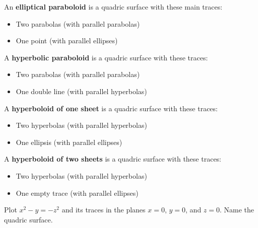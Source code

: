 \documentclass[letterpaper, twoside, 12pt]{book}
\begin{document}
\begin{definition}
  An \textbf{elliptical paraboloid} is a quadric surface with these main traces:
    \begin{itemize}
    \item Two parabolas (with parallel parabolas)
    \item One point (with parallel ellipses)
    \end{itemize}
\end{definition}

\begin{definition}
  A \textbf{hyperbolic paraboloid} is a quadric surface with these traces:
    \begin{itemize}
    \item Two parabolas (with parallel parabolas)
    \item One double line (with parallel hyperbolas)
    \end{itemize}
\end{definition}

\begin{definition}
  A \textbf{hyperboloid of one sheet} is a quadric surface with these traces:
    \begin{itemize}
    \item Two hyperbolas (with parallel hyperbolas)
    \item One ellipsis (with parallel ellipses)
    \end{itemize}
\end{definition}

\begin{definition}
  A \textbf{hyperboloid of two sheets} is a quadric surface with these traces:
    \begin{itemize}
    \item Two hyperbolas (with parallel hyperbolas)
    \item One empty trace (with parallel ellipses)
    \end{itemize}
\end{definition}

          \begin{problem}
            Plot $x^2-y=-z^2$ and its traces in the planes $x=0$, $y=0$,
            and $z=0$.
            Name the quadric surface.
          \end{problem}

          \begin{solution}

          \end{solution}
\end{document}
